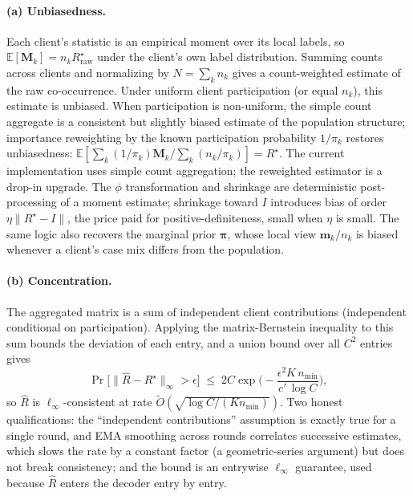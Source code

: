 \documentclass[11pt,a4paper]{article}
\theoremstyle{definition}
\newcommand{\Rhat}{\widehat{R}}
\begin{document}
\paragraph{(a) Unbiasedness.} Each client's statistic is an empirical moment over its local labels, so $\mathbb{E}[\mathbf{M}_k]=n_k R^{\star}_{\mathrm{raw}}$ under the client's own label distribution. Summing counts across clients and normalizing by $N=\sum_k n_k$ gives a count-weighted estimate of the raw co-occurrence. Under uniform client participation (or equal $n_k$), this estimate is unbiased. When participation is non-uniform, the simple count aggregate is a consistent but slightly biased estimate of the population structure; importance reweighting by the known participation probability $1/\pi_k$ restores unbiasedness: $\mathbb{E}[\sum_k (1/\pi_k)\mathbf{M}_k / \sum_k (n_k/\pi_k)]=R^{\star}$. The current implementation uses simple count aggregation; the reweighted estimator is a drop-in upgrade. The $\phi$ transformation and shrinkage are deterministic post-processing of a moment estimate; shrinkage toward $I$ introduces bias of order $\eta\|R^{\star}-I\|$, the price paid for positive-definiteness, small when $\eta$ is small. The same logic also recovers the marginal prior $\boldsymbol\pi$, whose local view $\mathbf{m}_k/n_k$ is biased whenever a client's case mix differs from the population.

\paragraph{(b) Concentration.} The aggregated matrix is a sum of independent client contributions (independent conditional on participation). Applying the matrix-Bernstein inequality \citep{tropp2015matrix} to this sum bounds the deviation of each entry, and a union bound over all $C^{2}$ entries gives
\begin{equation*}
\Pr\!\big[\|\Rhat-R^{\star}\|_\infty>\epsilon\big]\;\leq\;2C\exp\!\Big(-\frac{\epsilon^{2}K\,n_{\min}}{c'\,\log C}\Big),
\end{equation*}
so $\Rhat$ is $\ell_\infty$-consistent at rate \allowbreak$\tilde O(\sqrt{\log C/(K n_{\min})})$. Two honest qualifications: the ``independent contributions'' assumption is exactly true for a single round, and EMA smoothing across rounds correlates successive estimates, which slows the rate by a constant factor (a geometric-series argument) but does not break consistency; and the bound is an entrywise $\ell_\infty$ guarantee, used because $\Rhat$ enters the decoder entry by entry.
\end{document}
